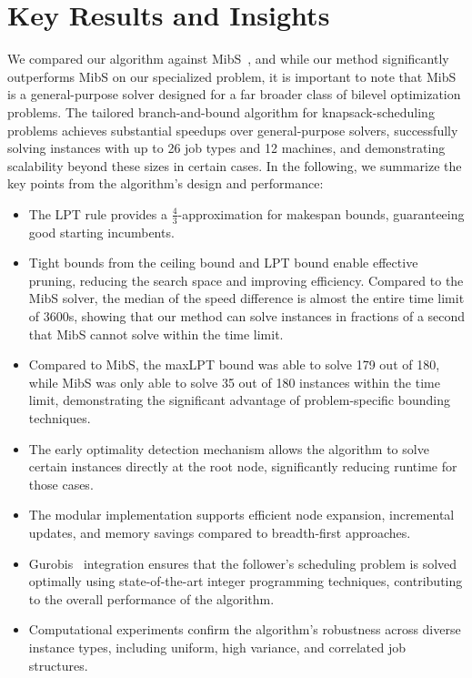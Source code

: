 \section{Key Results and Insights}
We compared our algorithm against MibS~\cite{Tahernejad2020}, and while our method significantly outperforms MibS on our specialized problem, 
it is important to note that MibS is a general-purpose solver designed for a far broader class of bilevel optimization problems.
The tailored branch-and-bound algorithm for knapsack-scheduling problems achieves substantial speedups over general-purpose solvers, successfully solving instances with up to 26 job types and 12 machines, 
and demonstrating scalability beyond these sizes in certain cases. In the following, we summarize the key points from the algorithm's design and performance:
\begin{itemize}
    \item The LPT rule provides a $\frac{4}{3}$-approximation for makespan bounds, guaranteeing good starting incumbents.
    \item Tight bounds from the ceiling bound and LPT bound enable effective pruning, reducing the search space and improving efficiency. 
    Compared to the MibS solver, the median of the speed difference is almost the entire time limit of 3600s, 
    showing that our method can solve instances in fractions of a second that MibS cannot solve within the time limit.
    \item Compared to MibS, the maxLPT bound was able to solve 179 out of 180, while MibS was only able to solve 35 out of 180 instances within the time limit, demonstrating the significant advantage of problem-specific bounding techniques.
    \item The early optimality detection mechanism allows the algorithm to solve certain instances directly at the root node, significantly reducing runtime for those cases.
    \item The modular implementation supports efficient node expansion, incremental updates, and memory savings compared to breadth-first approaches.
    \item Gurobis~\cite{gurobi} integration ensures that the follower's scheduling problem is solved optimally using state-of-the-art integer programming techniques, contributing to the overall performance of the algorithm.
    \item Computational experiments confirm the algorithm's robustness across diverse instance types, including uniform, high variance, and correlated job structures.
\end{itemize}

